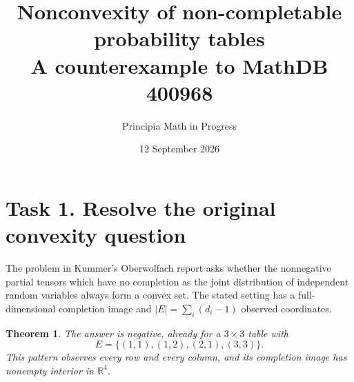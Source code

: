 \documentclass[11pt]{article}
\title{Nonconvexity of non-completable probability tables\\
\large A counterexample to MathDB 400968}
\author{Principia Math in Progress}
\date{12 September 2026}
\newtheorem{theorem}{Theorem}
\begin{document}
\maketitle
\section*{Task 1. Resolve the original convexity question}
The problem in Kummer's Oberwolfach report \cite[p.~1271]{report}
asks whether the nonnegative partial tensors which have no completion
as the joint distribution of independent random variables always form
a convex set. The stated setting has a full-dimensional completion
image and $|E|=\sum_i(d_i-1)$ observed coordinates.

\begin{theorem}
The answer is negative, already for a $3\times3$ table with
\[
 E=\{(1,1),(1,2),(2,1),(3,3)\}.
\]
This pattern observes every row and every column, and its completion
image has nonempty interior in $\mathbb R^4$.
\end{theorem}
\end{document}
